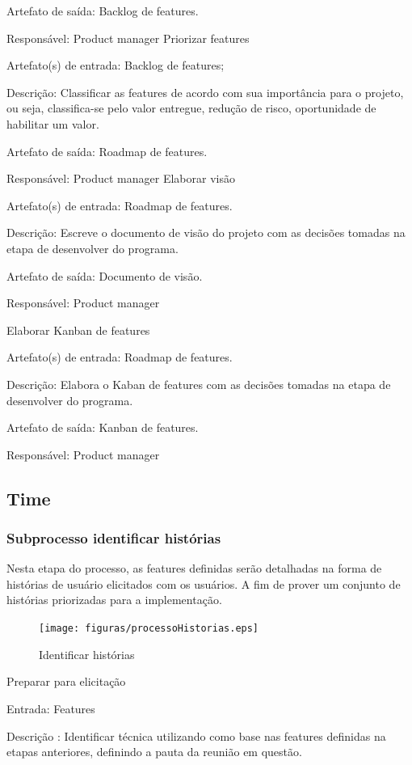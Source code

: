 Artefato de saída: Backlog de features.

Responsável: Product manager
Priorizar features

Artefato(s) de entrada: Backlog de features;

Descrição: Classificar as features de acordo com sua importância para o projeto, ou seja, classifica-se pelo valor entregue, redução de risco, oportunidade de habilitar um valor.

Artefato de saída: Roadmap de features.

Responsável: Product manager
Elaborar visão

Artefato(s) de entrada: Roadmap de features.

Descrição: Escreve o documento de visão do projeto com as decisões tomadas na etapa de desenvolver do programa.

Artefato de saída: Documento de visão.

Responsável: Product manager

Elaborar Kanban de features

Artefato(s) de entrada: Roadmap de features.

Descrição: Elabora o Kaban de features com as decisões tomadas na etapa de desenvolver do programa.

Artefato de saída: Kanban de features.

Responsável: Product manager
\subsection{Time}
\subsubsection{ Subprocesso identificar histórias}

Nesta etapa do processo, as features definidas serão detalhadas na forma de histórias de usuário elicitados com os usuários. A fim de prover um conjunto de histórias priorizadas para a implementação.

\begin{figure}[H]
    \centering
    \caption{Identificar histórias}
    \label{processoHistorias}
    \texttt{[image: figuras/processoHistorias.eps]}
\end{figure}


Preparar para elicitação

Entrada: Features

Descrição : Identificar técnica utilizando como base nas features definidas na etapas anteriores, definindo a pauta da reunião em questão.

